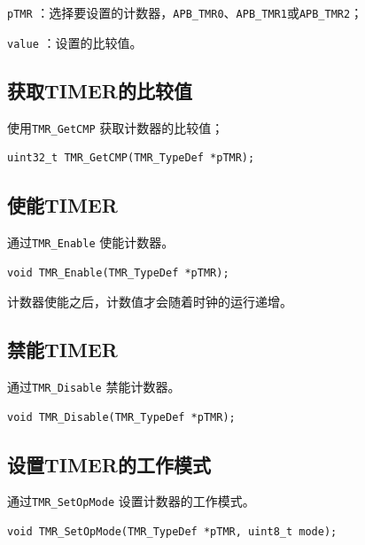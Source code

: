 \documentclass[
  12pt,
]{book}
\begin{document}
\texttt{pTMR} ：选择要设置的计数器，\texttt{APB\_TMR0}、\texttt{APB\_TMR1}或\texttt{APB\_TMR2}；

\texttt{value} ：设置的比较值。

\hypertarget{ux83b7ux53d6timerux7684ux6bd4ux8f83ux503c}{%
\subsection{获取TIMER的比较值}\label{ux83b7ux53d6timerux7684ux6bd4ux8f83ux503c}}

使用\texttt{TMR\_GetCMP} 获取计数器的比较值；

\begin{verbatim}
uint32_t TMR_GetCMP(TMR_TypeDef *pTMR);
\end{verbatim}

\hypertarget{ux4f7fux80fdtimer}{%
\subsection{使能TIMER}\label{ux4f7fux80fdtimer}}

通过\texttt{TMR\_Enable} 使能计数器。

\begin{verbatim}
void TMR_Enable(TMR_TypeDef *pTMR);
\end{verbatim}

计数器使能之后，计数值才会随着时钟的运行递增。

\hypertarget{ux7981ux80fdtimer}{%
\subsection{禁能TIMER}\label{ux7981ux80fdtimer}}

通过\texttt{TMR\_Disable} 禁能计数器。

\begin{verbatim}
void TMR_Disable(TMR_TypeDef *pTMR);
\end{verbatim}

\hypertarget{ux8bbeux7f6etimerux7684ux5de5ux4f5cux6a21ux5f0f}{%
\subsection{设置TIMER的工作模式}\label{ux8bbeux7f6etimerux7684ux5de5ux4f5cux6a21ux5f0f}}

通过\texttt{TMR\_SetOpMode} 设置计数器的工作模式。

\begin{verbatim}
void TMR_SetOpMode(TMR_TypeDef *pTMR, uint8_t mode);
\end{verbatim}
\end{document}
